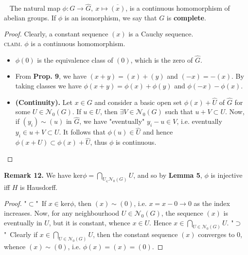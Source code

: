 \documentclass[12pt,a4paper,footinclude=true,headinclude=true]{scrbook} %
\newenvironment{proposition}[2][]
{\renewcommand\theinnercustomprop{#2}\innercustomprop[#1] 
\begin{mdframed}[backgroundcolor=gray!20]\ }
{\end{mdframed}\endinnercustomprop}
\newenvironment{remark}[2][Remark]
    { \begin{mdframed}[backgroundcolor=gray!20] \textbf{#1 #2.} }
    {  \end{mdframed}}
\begin{document}
\begin{proposition}{11}
    The natural map $\phi:G\to\widehat{G},\ x\mapsto\overline{(x)}$, is a continuous homomorphism of abelian groups. If $\phi$ is an isomorphism, we say that $G$ is \textbf{complete}.
\end{proposition}
\begin{proof}
    Clearly, a constant sequence $(x)$ is a Cauchy sequence.\\
    \textsc{claim.} $\phi$ is a continuous homomorphism.
    \begin{itemize}
        \item $\phi(0)$ is the equivalence class of $(0)$, which is the zero of $\widehat{G}$.
        \item From \textbf{Prop. 9}, we have $(x+y)=(x)+(y)$ and $(-x)=-(x)$. By taking classes we have $\phi(x+y)=\phi(x)+\phi(y)$ and $\phi(-x)-\phi(x)$. 
        \item \textbf{(Continuity).} Let $x\in G$ and consider a basic open set $\phi(x)+\widehat{U}$ of $\widehat{G}$ for some $U\in\mathcal{N}_0(G)$. If $u\in U$, then $\exists V\in\mathcal{N}_0(G)$ such that $u+V\subset U$. Now, if $(y_i)\sim(u)$ in $\widehat{G}$, we have "eventually" $y_i-u\in V$, i.e. eventually $y_i\in u+V\subset U$. It follows that $\phi(u)\in\widehat{U}$ and hence $\phi(x+U)\subset\phi(x)+\widehat{U}$, thus $\phi$ is continuous.
    \end{itemize}
\end{proof}

\begin{remark}{12}
    We have $\mathrm{ker}\phi=\bigcap_{U_\in\mathcal{N}_0(G)}U$, and so by \textbf{Lemma 5}, $\phi$ is injective iff $H$ is Hausdorff. 
\end{remark}
\begin{proof}
    "$\subset$"\ If $x\in\mathrm{ker}\phi$, then $(x)\sim(0)$, i.e. $x=x-0\longrightarrow0$ as the index increases. Now, for any neighbourhood $U\in\mathcal{N}_0(G)$, the sequence $(x)$ is eventually in $U$, but it is constant, whence $x\in U$. Hence $x\in\bigcap_{U\in\mathcal{N}_0(G)}U$. "$\supset$"\ Clearly if $x\in\bigcap_{U\in\mathcal{N}_0(G)}U$, then the constant sequence $(x)$ converges to $0$, whence $(x)\sim(0)$, i.e. $\phi(x)=(x)=(0)$.
\end{proof}
\end{document}
